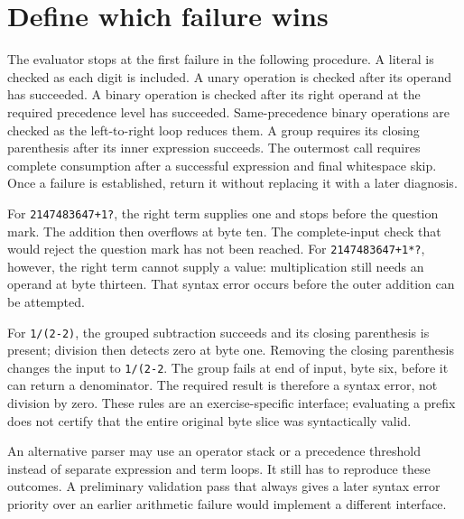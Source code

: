 \section{Define which failure wins}\label{expression-priority}
The evaluator stops at the first failure in the following procedure. A literal is
checked as each digit is included. A unary operation is checked after its operand
has succeeded. A binary operation is checked after its right operand at the required
precedence level has succeeded. Same-precedence binary operations are checked as the
left-to-right loop reduces them. A group requires its closing parenthesis after its
inner expression succeeds. The outermost call requires complete consumption after
a successful expression and final whitespace skip. Once a failure is established,
return it without replacing it with a later diagnosis.

For \texttt{2147483647+1?}, the right term supplies one and stops before the question
mark. The addition then overflows at byte ten. The complete-input check that would
reject the question mark has not been reached. For \texttt{2147483647+1*?}, however,
the right term cannot supply a value: multiplication still needs an operand at byte
thirteen. That syntax error occurs before the outer addition can be attempted.

For \texttt{1/(2-2)}, the grouped subtraction succeeds and its closing parenthesis
is present; division then detects zero at byte one. Removing the closing parenthesis
changes the input to \texttt{1/(2-2}. The group fails at end of input, byte six,
before it can return a denominator. The required result is therefore a syntax error,
not division by zero. These rules are an exercise-specific interface; evaluating a
prefix does not certify that the entire original byte slice was syntactically valid.

An alternative parser may use an operator stack or a precedence threshold instead
of separate expression and term loops. It still has to reproduce these outcomes.
A preliminary validation pass that always gives a later syntax error priority over
an earlier arithmetic failure would implement a different interface.
